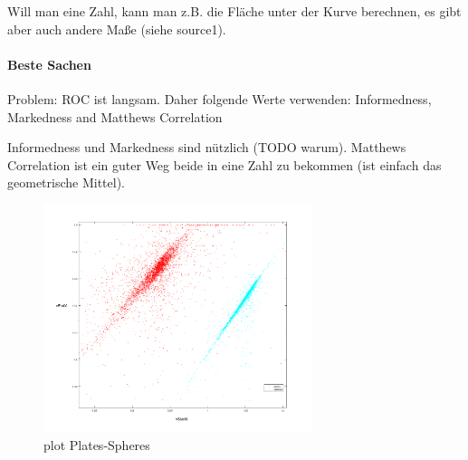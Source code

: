 Will man eine Zahl, kann man z.B. die Fläche unter der Kurve berechnen, es gibt aber auch andere Maße (siehe source1).

\paragraph{Beste Sachen}

Problem: ROC ist langsam.
Daher folgende Werte verwenden:
Informedness, Markedness and Matthews Correlation

Informedness und Markedness sind nützlich (TODO warum).
Matthews Correlation ist ein guter Weg beide in eine Zahl zu bekommen (ist einfach das geometrische Mittel).


\begin{figure}[!h]
    \centering
    \includegraphics[width=0.7\textwidth]{pics/plotPlates-Spheres.png}
    \caption{plot Plates-Spheres}
    \label{fig:plotPlates-Spheres}
\end{figure}